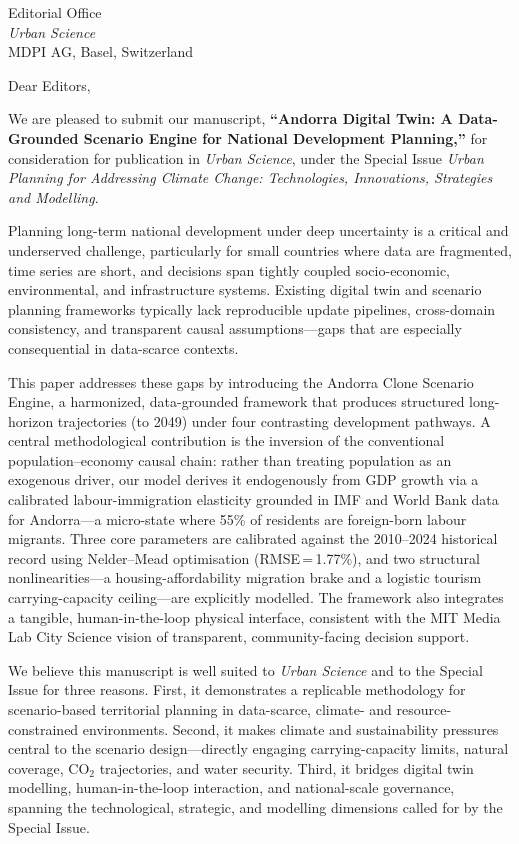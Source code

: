 \documentclass[11pt,a4paper]{letter}
\begin{document}
\begin{letter}{Editorial Office\\
\textit{Urban Science}\\
MDPI AG, Basel, Switzerland}

\opening{Dear Editors,}

We are pleased to submit our manuscript, \textbf{``Andorra Digital Twin: A
Data-Grounded Scenario Engine for National Development Planning,''} for
consideration for publication in \textit{Urban Science}, under the Special
Issue \textit{Urban Planning for Addressing Climate Change: Technologies,
Innovations, Strategies and Modelling}.

Planning long-term national development under deep uncertainty is a critical
and underserved challenge, particularly for small countries where data are
fragmented, time series are short, and decisions span tightly coupled
socio-economic, environmental, and infrastructure systems. Existing digital
twin and scenario planning frameworks typically lack reproducible update
pipelines, cross-domain consistency, and transparent causal assumptions---gaps
that are especially consequential in data-scarce contexts.

This paper addresses these gaps by introducing the Andorra Clone Scenario
Engine, a harmonized, data-grounded framework that produces structured
long-horizon trajectories (to 2049) under four contrasting development
pathways. A central methodological contribution is the inversion of the
conventional population--economy causal chain: rather than treating population
as an exogenous driver, our model derives it endogenously from GDP growth via a
calibrated labour-immigration elasticity grounded in IMF and World Bank data
for Andorra---a micro-state where 55\% of residents are foreign-born labour
migrants. Three core parameters are calibrated against the 2010--2024
historical record using Nelder--Mead optimisation (RMSE\,=\,1.77\%), and two
structural nonlinearities---a housing-affordability migration brake and a
logistic tourism carrying-capacity ceiling---are explicitly modelled. The
framework also integrates a tangible, human-in-the-loop physical interface,
consistent with the MIT Media Lab City Science vision of transparent,
community-facing decision support.

We believe this manuscript is well suited to \textit{Urban Science} and to the
Special Issue for three reasons. First, it demonstrates a replicable
methodology for scenario-based territorial planning in data-scarce, climate-
and resource-constrained environments. Second, it makes climate and
sustainability pressures central to the scenario design---directly engaging
carrying-capacity limits, natural coverage, CO$_2$ trajectories, and water
security. Third, it bridges digital twin modelling, human-in-the-loop
interaction, and national-scale governance, spanning the technological,
strategic, and modelling dimensions called for by the Special Issue.


\end{letter}
\end{document}
